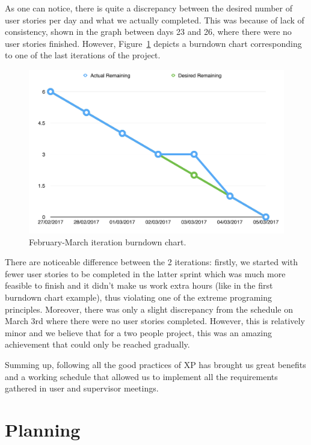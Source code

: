 \documentclass{l4proj}
\begin{document}
As one can notice, there is quite a discrepancy between the desired number of user stories per day and what we actually
completed. This was because of lack of consistency, shown in the graph between days 23 and 26, where there were no user
stories finished. However, Figure~\ref{fig:burndown-february} depicts a burndown chart corresponding to one of the last iterations of the project.

\pagebreak

\begin{figure}[!ht]
\centering
\includegraphics[scale=0.6]{recent-burndown}
\caption{February-March iteration burndown chart.}
\label{fig:burndown-february}
\end{figure}

There are noticeable difference between the 2 iterations: firstly, we started with fewer user stories to be completed in the latter sprint which was much more feasible to finish and it didn't make us work extra hours (like in the first burndown chart example), thus violating one of the extreme programing principles. Moreover, there was only a slight discrepancy from the schedule on March 3rd where there were no user stories completed. However, this is relatively minor and we believe that for a two people project, this was an amazing achievement that could only be reached gradually.

Summing up, following all the good practices of XP has brought us great benefits and a working schedule that allowed us to implement all the requirements gathered in user and supervisor meetings.

\section{Planning}
\end{document}
